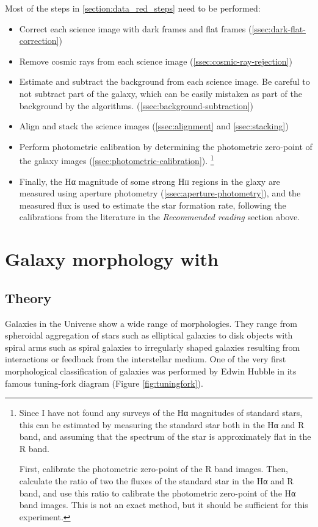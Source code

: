\documentclass[a4paper, 11pt, fleqn]{memoir}
\begin{document}
Most of the steps in \cref{section:data_red_steps} need to be performed:
\begin{itemize}
    \item Correct each science image with dark frames and flat frames (\cref{ssec:dark-flat-correction})
    \item Remove cosmic rays from each science image (\cref{ssec:cosmic-ray-rejection})
    \item Estimate and subtract the background from each science image. Be careful to not subtract part of the galaxy, which can be easily mistaken as part of the background by the algorithms. (\cref{ssec:background-subtraction})
    \item Align and stack the science images (\cref{ssec:alignment} and \cref{ssec:stacking})
    \item Perform photometric calibration by determining the photometric zero-point of the galaxy images (\cref{ssec:photometric-calibration}).
    \footnote{Since I have not found any surveys of the Hα magnitudes of standard stars, this can be estimated by measuring the standard star both in the Hα and R band, and assuming that the spectrum of the star is approximately flat in the R band.

    First, calibrate the photometric zero-point of the R band images. Then, calculate the ratio of two the fluxes of the standard star in the Hα and R band, and use this ratio to calibrate the photometric zero-point of the Hα band images.
    This is not an exact method, but it should be sufficient for this experiment.}
    \item Finally, the Hα magnitude of some strong H\textsc{ii} regions in the glaxy are measured using aperture photometry (\cref{ssec:aperture-photometry}), and the measured flux is used to estimate the star formation rate, following the calibrations from the literature in the \emph{Recommended reading} section above.
\end{itemize}

\section{Galaxy morphology with }

\subsection{Theory}

Galaxies in the Universe show a wide range of morphologies.
They range from spheroidal aggregation of stars such as elliptical galaxies to disk objects with spiral arms such as spiral galaxies to irregularly shaped galaxies resulting from interactions or feedback from the interstellar medium.
One of the very first morphological classification of galaxies was performed by Edwin Hubble in its famous tuning-fork diagram (Figure \ref{fig:tuningfork}).
\end{document}
